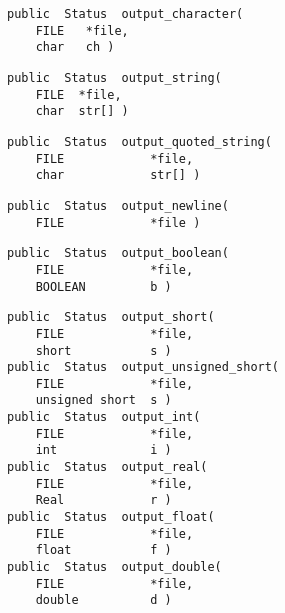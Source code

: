
{\bf\begin{verbatim}
public  Status  output_character(
    FILE   *file,
    char   ch )
\end{verbatim}}


{\bf\begin{verbatim}
public  Status  output_string(
    FILE  *file,
    char  str[] )
\end{verbatim}}


{\bf\begin{verbatim}
public  Status  output_quoted_string(
    FILE            *file,
    char            str[] )
\end{verbatim}}


{\bf\begin{verbatim}
public  Status  output_newline(
    FILE            *file )
\end{verbatim}}


{\bf\begin{verbatim}
public  Status  output_boolean(
    FILE            *file,
    BOOLEAN         b )
\end{verbatim}}


{\bf\begin{verbatim}
public  Status  output_short(
    FILE            *file,
    short           s )
public  Status  output_unsigned_short(
    FILE            *file,
    unsigned short  s )
public  Status  output_int(
    FILE            *file,
    int             i )
public  Status  output_real(
    FILE            *file,
    Real            r )
public  Status  output_float(
    FILE            *file,
    float           f )
public  Status  output_double(
    FILE            *file,
    double          d )
\end{verbatim}}

